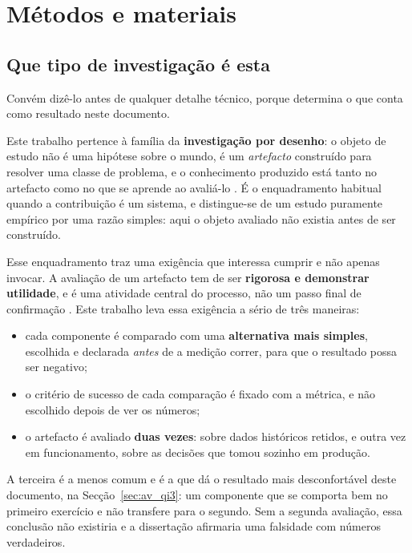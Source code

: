 
\chapter{Métodos e materiais}
\label{cap:metodologia}

\section{Que tipo de investigação é esta}
\label{sec:met_tipo}

Convém dizê-lo antes de qualquer detalhe técnico, porque determina o que conta como resultado
neste documento.

Este trabalho pertence à família da \textbf{investigação por desenho}: o objeto de estudo não é
uma hipótese sobre o mundo, é um \emph{artefacto} construído para resolver uma classe de problema,
e o conhecimento produzido está tanto no artefacto como no que se aprende ao avaliá-lo
\autocite{hevner2004design}. É o enquadramento habitual quando a contribuição é um sistema, e
distingue-se de um estudo puramente empírico por uma razão simples: aqui o objeto avaliado não
existia antes de ser construído.

Esse enquadramento traz uma exigência que interessa cumprir e não apenas invocar. A avaliação de
um artefacto tem de ser \textbf{rigorosa e demonstrar utilidade}, e é uma atividade central do
processo, não um passo final de confirmação \autocite{hevner2004design,peffers2007dsrm}. Este
trabalho leva essa exigência a sério de três maneiras:

\begin{itemize}
  \item cada componente é comparado com uma \textbf{alternativa mais simples}, escolhida e
        declarada \emph{antes} de a medição correr, para que o resultado possa ser negativo;
  \item o critério de sucesso de cada comparação é fixado com a métrica, e não escolhido depois
        de ver os números;
  \item o artefacto é avaliado \textbf{duas vezes}: sobre dados históricos retidos, e outra vez
        em funcionamento, sobre as decisões que tomou sozinho em produção.
\end{itemize}

A terceira é a menos comum e é a que dá o resultado mais desconfortável deste documento, na
Secção~\ref{sec:av_qi3}: um componente que se comporta bem no primeiro exercício e não transfere
para o segundo. Sem a segunda avaliação, essa conclusão não existiria e a dissertação afirmaria
uma falsidade com números verdadeiros.

